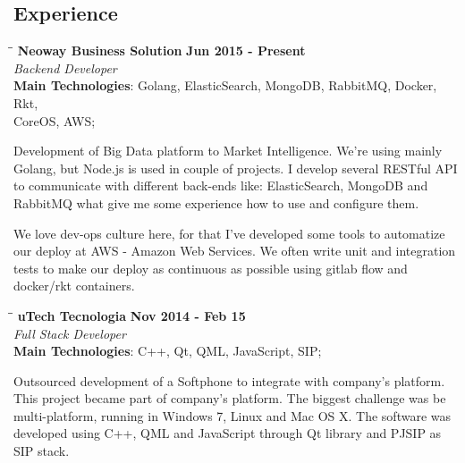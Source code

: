 \documentclass[margin]{res}
\begin{document}
\begin{resume}
\section{Experience}
\vspace{-0.1in}
    \begin{tabbing}
    \hspace{2.3in}\= \hspace{1.7in}\= \kill %
    \textbf{Neoway Business Solution}    \>\>\textbf{Jun 2015 - Present}\\
    \textit{Backend Developer}\\
    \textbf{Main Technologies}: Golang, ElasticSearch, MongoDB, RabbitMQ, Docker, Rkt,\\CoreOS, AWS;
    \end{tabbing}\vspace{-20pt}      %
    \vspace{2mm}
Development of Big Data platform to Market Intelligence. We're using mainly Golang, but Node.js is used in couple of projects. I develop several RESTful API to communicate with different back-ends like: ElasticSearch, MongoDB and RabbitMQ what give me some experience how to use and configure them. 

We love dev-ops culture here, for that I've developed some tools to automatize our deploy at AWS - Amazon Web Services. We often write unit and integration tests to make our deploy as continuous as possible using gitlab flow and docker/rkt containers.

\vspace{-0.1in}
    \begin{tabbing}
    \hspace{2.3in}\= \hspace{1.7in}\= \kill
    \textbf{uTech Tecnologia}    \>\>\textbf{Nov 2014 - Feb 15}\\
    \textit{Full Stack Developer}\\
    \textbf{Main Technologies}: C++, Qt, QML, JavaScript, SIP;
    \end{tabbing}\vspace{-20pt}
    \vspace{2mm}
Outsourced development of a Softphone to integrate with company’s platform. This project became part of company’s platform. The biggest challenge was be multi-platform, running in Windows 7, Linux and Mac OS X. The software was developed using C++, QML and JavaScript through Qt library and PJSIP as SIP stack.    


\end{resume}
\end{document}
